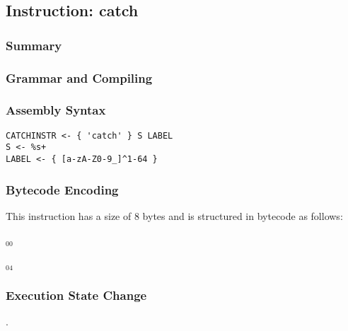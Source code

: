 \subsection{Instruction: catch}

\subsubsection{Summary}


\subsubsection{Grammar and Compiling}


\subsubsection{Assembly Syntax}

\begin{myquote}
\begin{verbatim}
CATCHINSTR <- { 'catch' } S LABEL
S <- %s+
LABEL <- { [a-zA-Z0-9_]^1-64 }
\end{verbatim}
\end{myquote}

\subsubsection{Bytecode Encoding}

This instruction has a size of 8 bytes and is structured in bytecode as follows:

$_{00}$\ 



$_{04}$\ 


\subsubsection{Execution State Change}

.


